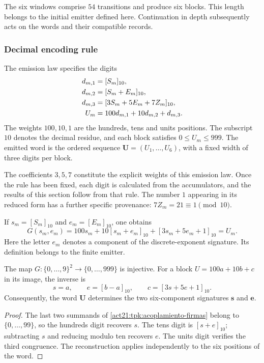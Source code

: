 The six windows comprise \(54\) transitions and produce six blocks.
This length belongs to the initial emitter defined here. Continuation
in depth subsequently acts on the words and their compatible records.

\subsubsection{Decimal encoding rule}

The emission law specifies the digits
\begin{align}
 d_{m,1}&=[S_m]_{10},\notag\\
 d_{m,2}&=[S_m+E_m]_{10},\notag\\
 d_{m,3}&=[3S_m+5E_m+7Z_m]_{10},\notag\\
 U_m&=100d_{m,1}+10d_{m,2}+d_{m,3}.
 \label{act21:tpk:bloque-decimal}
\end{align}
The weights \(100,10,1\) are the hundreds, tens and units positions.
The subscript \(10\) denotes the decimal residue, and each block satisfies
\(0\leq U_m\leq999\). The emitted word is the ordered sequence
\(\mathbf U=(U_1,\ldots,U_6)\), with a fixed width of three digits per
block.

The coefficients \(3,5,7\) constitute the explicit weights of this
emission law. Once the rule has been fixed, each digit is calculated from
the accumulators, and the results of this section follow from that rule.
The number \(1\) appearing in its reduced form has a further specific
provenance: \(7Z_m=21\equiv1\pmod{10}\).

If \(s_m=[S_m]_{10}\) and \(e_m=[E_m]_{10}\), one obtains
\begin{equation}
 G(s_m,e_m)=100s_m+10[s_m+e_m]_{10}
                   +[3s_m+5e_m+1]_{10}=U_m.
 \label{act21:tpk:acoplamiento-firmas}
\end{equation}
Here the letter \(e_m\) denotes a component of the discrete-exponent
signature. Its definition belongs to the finite emitter.

\begin{proposition}
\label{act21:tpk:recuperacion-firmas}
The map \(G:\{0,\ldots,9\}^2\to\{0,\ldots,999\}\) is injective.
For a block \(U=100a+10b+c\) in its image, the inverse is
\[
 s=a,\qquad e=[b-a]_{10},\qquad
 c=[3s+5e+1]_{10}.
\]
Consequently, the word \(\mathbf U\) determines the two six-component
signatures \(\mathbf s\) and \(\mathbf e\).
\end{proposition}
\begin{proof}
The last two summands of \eqref{act21:tpk:acoplamiento-firmas} belong to
\(\{0,\ldots,99\}\), so the hundreds digit recovers \(s\). The tens digit
is \([s+e]_{10}\); subtracting \(s\) and reducing modulo ten recovers
\(e\). The units digit verifies the third congruence. The reconstruction
applies independently to the six positions of the word.
\end{proof}

